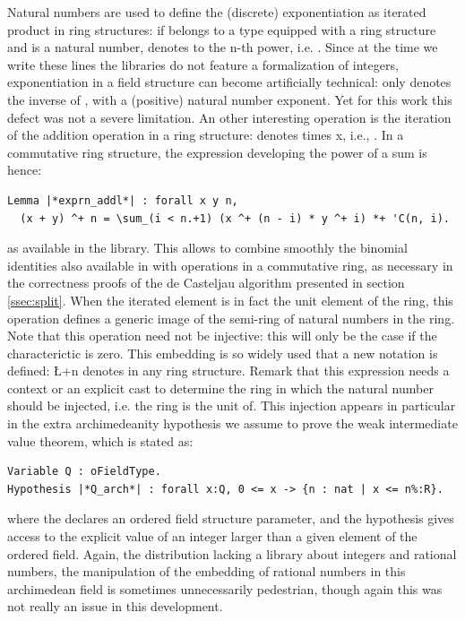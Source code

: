 \documentclass{mscs}
\begin{document}
Natural numbers are used to define the (discrete) exponentiation as
iterated
product in ring structures: if  belongs to a type equipped with a
ring structure and  is a natural number,  denotes 
 to the {n}-th power, i.e. .
Since at the time we write these lines
the \ssr{} libraries do not feature a formalization of integers,
exponentiation in a field structure can become artificially
technical:  only denotes the inverse of , with a
(positive) natural number exponent. Yet for
this work this defect was not a severe limitation.
An other interesting operation is the iteration of the addition
operation in a ring structure:  denotes  times \C{}x,
i.e., .  In a commutative ring structure,
the expression developing the power of a sum is hence:
\begin{lstlisting}
Lemma |*exprn_addl*| : forall x y n,
  (x + y) ^+ n = \sum_(i < n.+1) (x ^+ (n - i) * y ^+ i) *+ 'C(n, i).
\end{lstlisting}
as available in the \ssr{} library. This allows to combine
smoothly the binomial identities also available in \ssr{} with
operations in a commutative ring, as necessary in the correctness
proofs of the de Casteljau algorithm presented in section 
\ref{ssec:split}.
When the iterated element  is
in fact  the unit element of the ring, this operation defines a
generic image of the semi-ring of natural numbers in the
ring. Note that this operation need not be injective: this will only
be the case if the characterictic is zero.
This embedding is so widely used that a new notation is defined: \L+n%
denotes  in any ring structure. Remark that this expression
needs a context or an explicit cast to determine the ring in which the
natural number should be injected, i.e. the ring  is the unit of.
This injection appears in particular in the extra archimedeanity
hypothesis we assume to prove the weak intermediate value theorem,
which is stated as:
\begin{lstlisting}
Variable Q : oFieldType.
Hypothesis |*Q_arch*| : forall x:Q, 0 <= x -> {n : nat | x <= n%:R}.
\end{lstlisting}
where the  declares an ordered field structure
parameter, and the  hypothesis gives access to the
explicit value of an integer larger than a given element of the
ordered field. Again, the \ssr{} distribution lacking a library about
integers and rational numbers, the manipulation of the
embedding of rational numbers in this archimedean field is sometimes
unnecessarily pedestrian, though again this was not really an issue in
this development.
\end{document}
